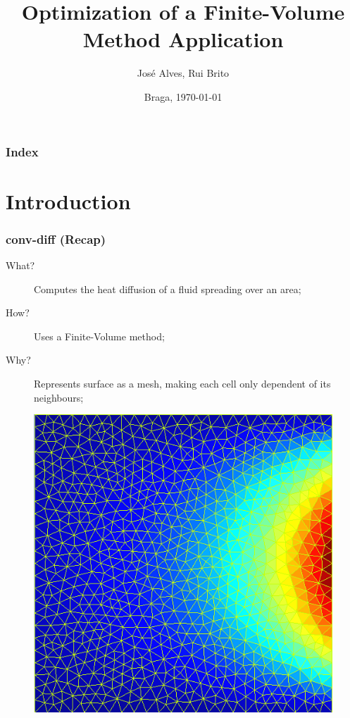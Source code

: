 \documentclass{beamer}
\title{Optimization of a Finite-Volume Method Application}
\author{José Alves, Rui Brito}
\institute[22765, 22781]{
	Universidade do Minho
}
\date{Braga, \today}
\begin{document}

\maketitle%

\begin{frame}
	\frametitle{Index}
	\tableofcontents
\end{frame}

\section{Introduction}
\begin{frame}
	\frametitle{conv-diff (Recap)}
	\begin{description}
		\item [What?] Computes the heat diffusion of a fluid spreading over an area;
		\item [How?] Uses a Finite-Volume method;
		\item [Why?] Represents surface as a mesh, making each cell only dependent of its neighbours;
	\end{description}
\end{frame}

\begin{frame}
	\begin{figure}[!htp]
    	\centering   
        \includegraphics[width=.6\textwidth]{../images/mesh.png}        
	\end{figure}
\end{frame}
\end{document}
